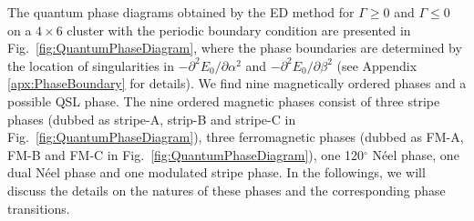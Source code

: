 \documentclass[aps,prb,reprint,amsfonts,amsmath,amssymb,showpacs,groupedaddress,superscriptaddress]{revtex4-1}
\begin{document}
The quantum phase diagrams obtained by the ED method for $\Gamma \geq 0$ and $\Gamma \leq 0$ on a $4 \times 6$ cluster with the periodic boundary condition are presented in Fig.~\ref{fig:QuantumPhaseDiagram}, where the phase boundaries are determined by the location of singularities in $-\partial^2E_0/\partial\alpha^2$ and $-\partial^2E_0/\partial\beta^2$ (see Appendix \ref{apx:PhaseBoundary} for details). We find nine magnetically ordered phases and a possible QSL phase. The nine ordered magnetic phases consist of three stripe phases (dubbed as stripe-A, strip-B and stripe-C in Fig.~\ref{fig:QuantumPhaseDiagram}), three ferromagnetic phases (dubbed as FM-A, FM-B and FM-C in Fig.~\ref{fig:QuantumPhaseDiagram}), one 120$^\circ$ N\'{e}el phase, one dual N\'{e}el phase and one modulated stripe phase. In the followings, we will discuss the details on the natures of these phases and the corresponding phase transitions.
\end{document}
